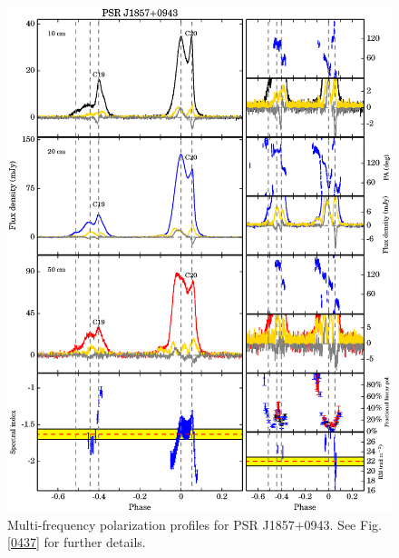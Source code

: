 \documentclass[useAMS,usenatbib]{mn2e}
\begin{document}
\begin{appendix}
\begin{figure}
\begin{center}
\includegraphics[width=6 in]{1857.ps}
\caption{Multi-frequency polarization profiles for PSR J1857$+$0943. 
See Fig. \ref{0437} for further details.}
\label{1857}
\end{center}
\end{figure}


\end{appendix}
\end{document}
